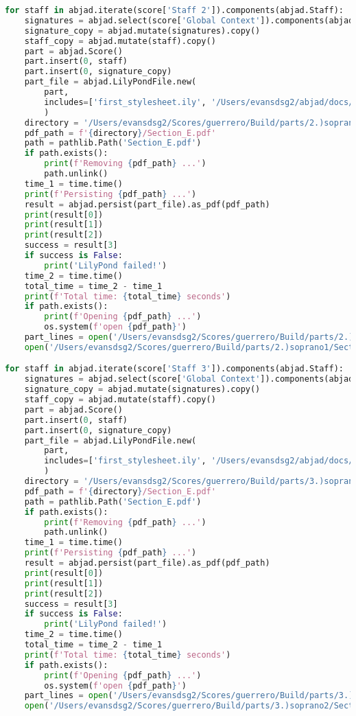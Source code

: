 \begin{lstlisting}[language=Python, caption=Invocation Source Code]
for staff in abjad.iterate(score['Staff 2']).components(abjad.Staff):
    signatures = abjad.select(score['Global Context']).components(abjad.Staff)
    signature_copy = abjad.mutate(signatures).copy()
    staff_copy = abjad.mutate(staff).copy()
    part = abjad.Score()
    part.insert(0, staff)
    part.insert(0, signature_copy)
    part_file = abjad.LilyPondFile.new(
        part,
        includes=['first_stylesheet.ily', '/Users/evansdsg2/abjad/docs/source/_stylesheets/abjad.ily'],
        )
    directory = '/Users/evansdsg2/Scores/guerrero/Build/parts/2.)soprano1'
    pdf_path = f'{directory}/Section_E.pdf'
    path = pathlib.Path('Section_E.pdf')
    if path.exists():
        print(f'Removing {pdf_path} ...')
        path.unlink()
    time_1 = time.time()
    print(f'Persisting {pdf_path} ...')
    result = abjad.persist(part_file).as_pdf(pdf_path)
    print(result[0])
    print(result[1])
    print(result[2])
    success = result[3]
    if success is False:
        print('LilyPond failed!')
    time_2 = time.time()
    total_time = time_2 - time_1
    print(f'Total time: {total_time} seconds')
    if path.exists():
        print(f'Opening {pdf_path} ...')
        os.system(f'open {pdf_path}')
    part_lines = open('/Users/evansdsg2/Scores/guerrero/Build/parts/2.)soprano1/Section_E.ly').readlines()
    open('/Users/evansdsg2/Scores/guerrero/Build/parts/2.)soprano1/Section_E.ly', 'w').writelines(part_lines[15:-1])

for staff in abjad.iterate(score['Staff 3']).components(abjad.Staff):
    signatures = abjad.select(score['Global Context']).components(abjad.Staff)
    signature_copy = abjad.mutate(signatures).copy()
    staff_copy = abjad.mutate(staff).copy()
    part = abjad.Score()
    part.insert(0, staff)
    part.insert(0, signature_copy)
    part_file = abjad.LilyPondFile.new(
        part,
        includes=['first_stylesheet.ily', '/Users/evansdsg2/abjad/docs/source/_stylesheets/abjad.ily'],
        )
    directory = '/Users/evansdsg2/Scores/guerrero/Build/parts/3.)soprano2'
    pdf_path = f'{directory}/Section_E.pdf'
    path = pathlib.Path('Section_E.pdf')
    if path.exists():
        print(f'Removing {pdf_path} ...')
        path.unlink()
    time_1 = time.time()
    print(f'Persisting {pdf_path} ...')
    result = abjad.persist(part_file).as_pdf(pdf_path)
    print(result[0])
    print(result[1])
    print(result[2])
    success = result[3]
    if success is False:
        print('LilyPond failed!')
    time_2 = time.time()
    total_time = time_2 - time_1
    print(f'Total time: {total_time} seconds')
    if path.exists():
        print(f'Opening {pdf_path} ...')
        os.system(f'open {pdf_path}')
    part_lines = open('/Users/evansdsg2/Scores/guerrero/Build/parts/3.)soprano2/Section_E.ly').readlines()
    open('/Users/evansdsg2/Scores/guerrero/Build/parts/3.)soprano2/Section_E.ly', 'w').writelines(part_lines[15:-1])


\end{lstlisting}
